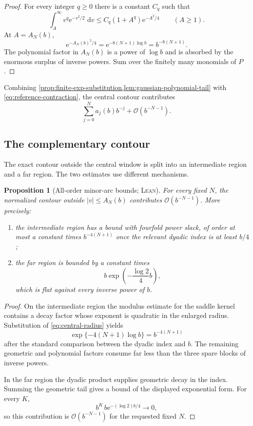 \documentclass[11pt,oneside]{article}
\newtheorem{proposition}[theorem]{Proposition}
\theoremstyle{definition}
\theoremstyle{remark}
\newcommand{\e}{\mathrm e}
\newcommand{\dd}{\,\mathrm d}
\newcommand{\bigO}{\mathcal O}
\newcommand{\Formalized}{\textsc{Lean}}
\begin{document}
\begin{proof}
For every integer $q\geq0$ there is a constant $C_q$ such that
\[
 \int_A^\infty v^q\e^{-v^2/2}\,\dd v
 \leq C_q(1+A^q)\e^{-A^2/4}
 \qquad(A\geq1).
\]
At $A=A_N(b)$,
\[
 \e^{-A_N(b)^2/4}
 =\e^{-8(N+1)\log b}
 =b^{-8(N+1)}.
\]
The polynomial factor in $A_N(b)$ is a power of $\log b$ and is absorbed
by the enormous surplus of inverse powers.  Sum over the finitely many
monomials of $P$.
\end{proof}

Combining \cref{prop:finite-exp-substitution,lem:gaussian-polynomial-tail}
with \eqref{eq:reference-contraction}, the central contour contributes
\begin{equation}
 \sum_{j=0}^{N}a_j(b)b^{-j}+\bigO(b^{-N-1}).
 \label{eq:central-mass-expansion}
\end{equation}

\subsection{The complementary contour}

The exact contour outside the central window is split into an intermediate
region and a far region.  The two estimates use different mechanisms.

\begin{proposition}[All-order minor-arc bounds; \Formalized]
\label{prop:minor-arcs}
For every fixed $N$, the normalized contour outside
$|v|\leq A_N(b)$ contributes $\bigO(b^{-N-1})$.
More precisely:
\begin{enumerate}
\item the intermediate region has a bound with fourfold power slack,
of order at most a constant times $b^{-4(N+1)}$ once the relevant
dyadic index is at least $b/4$;
\item the far region is bounded by a constant times
\[
 b\exp\!\left(-\frac{\log2}{4}b\right),
\]
which is flat against every inverse power of $b$.
\end{enumerate}
\end{proposition}

\begin{proof}
On the intermediate region the modulus estimate for the saddle kernel
contains a decay factor whose exponent is quadratic in the enlarged
radius.  Substitution of \eqref{eq:central-radius} yields
\[
 \exp\{-4(N+1)\log b\}=b^{-4(N+1)}
\]
after the standard comparison between the dyadic index and $b$.  The
remaining geometric and polynomial factors consume far less than the
three spare blocks of inverse powers.

In the far region the dyadic product supplies geometric decay in the
index.  Summing the geometric tail gives a bound of the displayed
exponential form.  For every $K$,
\[
 b^K\,b\e^{-(\log2)b/4}\longrightarrow0,
\]
so this contribution is $\bigO(b^{-N-1})$ for the requested fixed $N$.
\end{proof}
\end{document}
